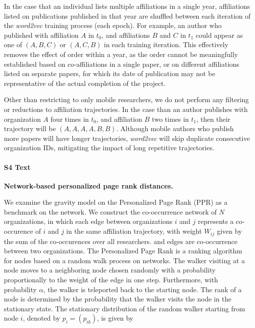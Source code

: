 \documentclass[12pt]{article} %
\begin{document}
In the case that an individual lists multiple affiliations in a single year, affiliations listed on publications published in that year are shuffled between each iteration of the \textit{word2vec} training process (each epoch).
For example, an author who published with affiliation $A$ in $t_{0}$, and affiliations $B$ and $C$ in $t_{1}$ could appear as one of $(A, B, C)$ or $(A, C, B)$ in each training iteration.
This effectively removes the effect of order within a year, as the order cannot be meaningfully established based on co-affiliations in a single paper, or on different affiliations listed on separate papers, for which its date of publication may not be representative of the actual completion of the project.

Other than restricting to only mobile researchers, we do not perform any filtering or reductions to affiliation trajectories.
In the case than an author publishes with organization $A$ four times in $t_{0}$, and affiliation $B$ two times in $t_{1}$, then their trajectory will be $(A, A, A, A, B, B)$.
Although mobile authors who publish more papers will have longer trajectories, \textit{word2vec} will skip duplicate consecutive organization IDs, mitigating the impact of long repetitive trajectories.




%
\paragraph*{S4 Text}
\label{si:text:ppr_dist}
{\bf Network-based personalized page rank distances.}


We examine the gravity model on the Personalized Page Rank (PPR)\autocite{jeh2003scaling} as a benchmark on the network. We construct the co-occurrence network of $N$ organizations, in which each edge between organizations $i$ and $j$ represents a co-occurence of $i$ and $j$ in the same affiliation trajectory, with weight $W_{ij}$ given by the sum of the co-occurences over all researchers. and edges are co-occurrence between two organizations. The Personalized Page Rank is a ranking algorithm for nodes based on a random walk process on networks. 
The walker visiting at a node moves to a neighboring node chosen randomly with a probability proportionally to the weight of the edge in one step. Furthermore, with probability $\alpha$, the walker is teleported back to the starting node. The rank of a node is determined by the probability that the walker visits the node in the stationary state. The stationary distribution of the random walker starting from node $i$, denoted by $p_i=(p_{ik})$, is given by 
\end{document}
